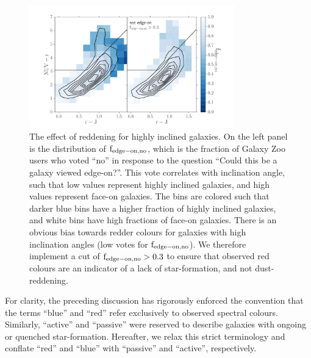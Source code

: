 \documentclass[useAMS,usenatbib]{mn2e}
\begin{document}
\begin{figure}
\centering
\includegraphics[width=3.5in,trim={1cm 0cm 1cm 1cm},clip]{figures/edgeon_colorcolor.pdf}
\caption{The effect of reddening for highly inclined galaxies. On the left panel is the distribution of $\rm f_{edge-on,no}$, which is the fraction of Galaxy Zoo users who voted ``no'' in response to the question ``Could this be a galaxy viewed edge-on?''. This vote correlates with inclination angle, such that low values represent highly inclined galaxies, and high values represent face-on galaxies. The bins are colored such that darker blue bins have a higher fraction of highly inclined galaxies, and white bins have high fractions of face-on galaxies. There is an obvious bias towards redder colours for galaxies with high inclination angles (low votes for $\rm f_{edge-on,no}$). We therefore implement a cut of $\rm f_{edge-on,no}>0.3$ to ensure that observed red colours are an indicator of a lack of star-formation, and not dust-reddening. }
\label{fig:edgeon}
\end{figure}

For clarity, the preceding discussion has rigorously enforced the convention that the terms ``blue'' and ``red'' refer exclusively to observed spectral colours. Similarly, ``active'' and ``passive'' were reserved to describe galaxies with ongoing or quenched star-formation. Hereafter, we relax this strict terminology and conflate ``red'' and ``blue'' with ``passive'' and ``active'', respectively.
\end{document}
